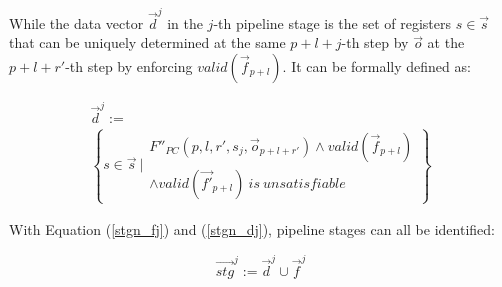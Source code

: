 \documentclass[conference]{IEEEtran}
\begin{document}
% 

While the data vector $\vec{d}^j$ in the $j$-th pipeline stage 
is the set of registers $s\in \vec{s}$ 
that can be uniquely determined at the same $p+l+j$-th step 
by $\vec{o}$ at the $p+l+r'$-th step by enforcing $valid(\vec{f}_{p+l})$.
It can be formally defined as:

\begin{multline}\label{stgn_dj}
\vec{d}^{j} := \\
 \left\{
 s\in \vec{s} ~| 
 \begin{array}{cc}
 F''_{PC}(p,l,r',s_j,\vec{o}_{p+l+r'})\wedge valid(\vec{f}_{p+l})\\
 \wedge valid(\vec{f'}_{p+l})~is~unsatisfiable
 \end{array}
\right\}
\end{multline}

With Equation (\ref{stgn_fj}) and (\ref{stgn_dj}),
pipeline stages can all be identified:

\begin{equation}
 \vec{stg}^j := \vec{d}^j\cup\vec{f}^j
\end{equation}


% 
% 
% 
\end{document}
